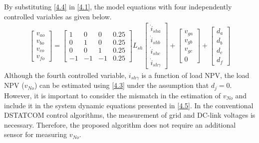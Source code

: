 By substituting \eqref{4.4} in \eqref{4.1}, the model equations with four independently controlled variables as given below.
\begin{equation} \label{4.5}
	\begin{aligned}
			\begin{bmatrix}
			v_{ao}\\
			v_{bo}\\
			v_{co}\\
			v_{fo}
			\end{bmatrix}
			= 
			\begin{bmatrix}
			1 & 0       & 0       & 0.25 \\
			0       & 1  & 0       & 0.25 \\
			0       & 0       & 1  & 0.25 \\
			-1 & -1 & -1 & 0.25
			\end{bmatrix}
			L_{sh}
			\begin{bmatrix}
			\dot{i}_{sha}\\
			\dot{i}_{shb}\\
			\dot{i}_{shc}\\
			\dot{i}_{sh\gamma}
			\end{bmatrix}
			+
			\begin{bmatrix}
			v_{ga}\\
			v_{gb}\\
			v_{gc}\\
			0
			\end{bmatrix}
			+
			\begin{bmatrix}
			d_{a}\\
			d_{b}\\
			d_{c}\\
			d_{f}
			\end{bmatrix}
	\end{aligned}
\end{equation} 
Although the fourth controlled variable, $i_{sh\gamma}$ is a function of load NPV, the load NPV ($v_{No}$) can be estimated using \eqref{4.3} under the assumption that $d_{j} = 0$. However, it is important to consider the mismatch in the estimation of $v_{No}$ and include it in the system dynamic equations presented in \eqref{4.5}. In the conventional DSTATCOM control algorithms, the measurement of grid and DC-link voltages is necessary. Therefore, the proposed algorithm does not require an additional sensor for measuring $v_{No}$.

\vspace*{1cm}
